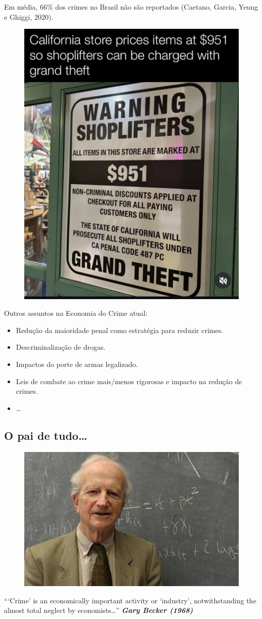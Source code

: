 \documentclass[a4paper,12pt]{article}[abntex2]
\begin{document}
Em média, 66\% dos crimes no Brasil não são reportados (Caetano, Garcia, Yeung e Ghiggi, 2020).

\begin{figure}[H]
    \centering
    \includegraphics[width=0.7\linewidth]{Imagens/a19.1.png}
\end{figure}

Outros assuntos na Economia do Crime atual:
\begin{itemize}
  \item Redução da maioridade penal como estratégia para reduzir crimes.
  \item Descriminalização de drogas.
  \item Impactos do porte de armas legalizado.
  \item Leis de combate ao crime mais/menos rigorosas e impacto na redução de crimes.
  \item \dots
\end{itemize}

\subsection{\textbf{O pai de tudo…}}
\begin{figure}[H]
    \centering
    \includegraphics[width=0.7\linewidth]{Imagens/a19i2.png}
\end{figure}
“‘Crime’ is an economically important activity or ‘industry’, notwithstanding the almost  total neglect by economists…”
\textbf{\textit{Gary Becker (1968)}}
\end{document}
